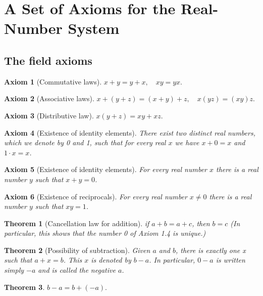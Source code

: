 \documentclass{article}
\newtheorem{axiom}{Axiom}[section]
\newtheorem{theorem}{Theorem}[section]
\begin{document}
\section{A Set of Axioms for the Real-Number System}

\subsection{The field axioms}

\begin{axiom}[Commutative laws]
\(x+y=y+x, \quad x y=y x .\)
\end{axiom}

\begin{axiom}[Associative laws]
\(x+(y+z)=(x+y)+z, \quad x(y z)=(x y) z .\)
\end{axiom}

\begin{axiom}[Distributive law]
\(x(y + z) = xy + xz.\)
\end{axiom}

\begin{axiom}[Existence of identity elements]
There exist two distinct real numbers, which we denote by 0 and 1, such that for every real \(x\) we have \(x + 0 = x\) and \(1 \cdot x = x\).
\end{axiom}

\begin{axiom}[Existence of identity elements]
For every real number \(x\) there is a real number \(y\) such that \(x + y = 0\).
\end{axiom}

\begin{axiom}[Existence of reciprocals]
For every real number \(x \neq 0\) there is a real number \(y\) such that \(xy = 1\).
\end{axiom}

\begin{theorem}[Cancellation law for addition]
if \(a + b = a + c\), then \(b = c\) (In particular, this shows that the number 0 of Axiom 1.4 is unique.)
\end{theorem}

\begin{theorem}[Possibility of subtraction]
Given \(a\) and \(b\), there is exactly one x such that \(a + x = b\). This \(x\) is denoted by \(b - a\). In particular, \(0 - a\) is written simply \(-a\) and is called the negative \(a\).
\end{theorem}

\begin{theorem}
\(b - a = b + (-a).\)
\end{theorem}
\end{document}
